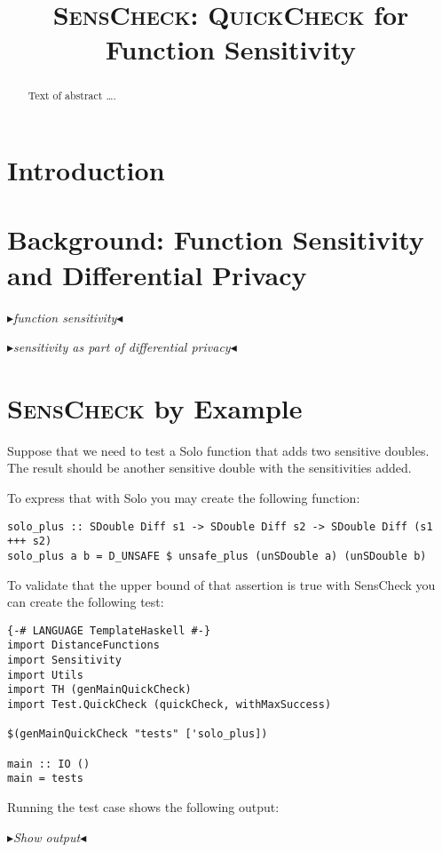 \documentclass[acmsmall,review,anonymous]{acmart}\settopmatter{printfolios=true,printccs=false,printacmref=false}
\newcommand{\system}{\textsc{SensCheck}\xspace}
\newcommand{\quickcheck}{\textsc{QuickCheck}\xspace}
\newcommand{\mynote}[2]
    {{\color{red} \fbox{\bfseries\sffamily\scriptsize#1}
    {\small$\blacktriangleright$\textsf{\emph{#2}}$\blacktriangleleft$}}~}
\newcommand{\todo}[1]{\mynote{TODO}{#1}}
\begin{document}
\title{\system: \quickcheck for Function Sensitivity}

\begin{abstract}
Text of abstract \ldots.
\end{abstract}
\maketitle


\section{Introduction}


\section{Background: Function Sensitivity and Differential Privacy}

\todo{function sensitivity}

\todo{sensitivity as part of differential privacy}

\section{\system by Example}

Suppose that we need to test a Solo function that adds two sensitive doubles.
The result should be another sensitive double with the sensitivities added.


To express that with Solo you may create the following function:
\begin{verbatim}
solo_plus :: SDouble Diff s1 -> SDouble Diff s2 -> SDouble Diff (s1 +++ s2)
solo_plus a b = D_UNSAFE $ unsafe_plus (unSDouble a) (unSDouble b)
\end{verbatim}

To validate that the upper bound of that assertion is true with SensCheck you can create the following test:
\begin{verbatim}
{-# LANGUAGE TemplateHaskell #-}
import DistanceFunctions
import Sensitivity
import Utils
import TH (genMainQuickCheck)
import Test.QuickCheck (quickCheck, withMaxSuccess)

$(genMainQuickCheck "tests" ['solo_plus])

main :: IO ()
main = tests
\end{verbatim}

Running the test case shows the following output:

\todo{Show output}
\end{document}
